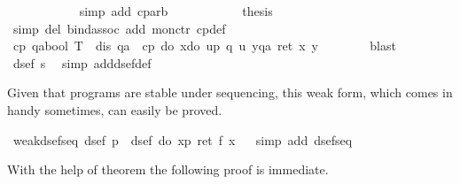 \begin{isabellebody}
\ \ \ \ \ \ \ \ \ \ \isamarkupfalse%
\ {\isacharparenleft}simp\ add{\isacharcolon}\ cp{\isacharunderscore}arb{\isacharparenright}\isanewline
\ \ \ \ \ \ \ \ \isamarkupfalse%
\ \isamarkupfalse%
\ {\isacharquery}thesis\ \isamarkupfalse%
\ {\isacharparenleft}simp\ del{\isacharcolon}\ bind{\isacharunderscore}assoc\ add{\isacharcolon}\ mon{\isacharunderscore}ctr\ cp{\isacharunderscore}def{\isacharparenright}\isanewline
\ \ \ \ \ \ \isamarkupfalse%
\isanewline
\ \ \ \ \isamarkupfalse%
\isacommand{{\isacharbraceright}}\isanewline
\ \ \ \ \isamarkupfalse%
\ {\isachardoublequote}cp\ {\isacharparenleft}qa{\isacharcolon}{\isacharcolon}bool\ T{\isacharparenright}\ {\isasymand}\ dis\ qa\ {\isasymlongrightarrow}\ cp\ {\isacharparenleft}do\ {\isacharbraceleft}x{\isasymleftarrow}do\ {\isacharbraceleft}u{\isasymleftarrow}p{\isacharsemicolon}\ q\ u{\isacharbraceright}{\isacharsemicolon}\ y{\isasymleftarrow}qa{\isacharsemicolon}\ ret\ {\isacharparenleft}x{\isacharcomma}\ y{\isacharparenright}{\isacharbraceright}{\isacharparenright}{\isachardoublequote}\isanewline
\ \ \ \ \ \ \isamarkupfalse%
\ blast\isanewline
\ \ \isamarkupfalse%
\isanewline
\ \ \isamarkupfalse%
\ \isamarkupfalse%
\ {\isachardoublequote}dsef\ {\isacharquery}s{\isachardoublequote}\ \isamarkupfalse%
\ {\isacharparenleft}simp\ add{\isacharcolon}dsef{\isacharunderscore}def{\isacharparenright}\isanewline
\isamarkupfalse%
\isamarkupfalse%
%
\begin{isamarkuptext}%
Given that  programs are stable under sequencing, this
        weak form, which comes in handy sometimes, can easily be proved.%
\end{isamarkuptext}%
\isamarkuptrue%
\ weak{\isacharunderscore}dsef{\isacharunderscore}seq{\isacharcolon}\ {\isachardoublequote}dsef\ p\ {\isasymLongrightarrow}\ dsef\ {\isacharparenleft}do\ {\isacharbraceleft}x{\isasymleftarrow}p{\isacharsemicolon}\ ret\ {\isacharparenleft}f\ x{\isacharparenright}{\isacharbraceright}{\isacharparenright}{\isachardoublequote}\isanewline
\ \ \isamarkupfalse%
simp\ add{\isacharcolon}\ dsef{\isacharunderscore}seq{\isacharparenright}\isamarkupfalse%
%
\begin{isamarkuptext}%
With the help of theorem  the following proof is
  immediate.%
\end{isamarkuptext}%

\end{isabellebody}
